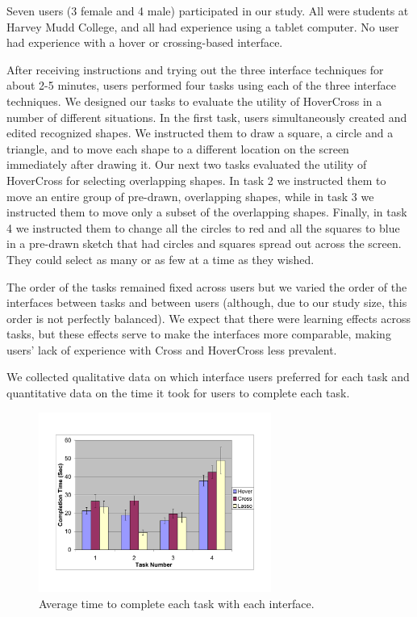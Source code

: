 \documentclass{article}
\begin{document}
Seven users (3 female and 4 male) participated in our study.   All
were students at Harvey Mudd College, and all had experience using
a tablet computer.  No user had experience with a hover or
crossing-based interface.   

After receiving instructions and trying out the three interface
techniques for about 2-5 minutes, users performed four tasks using
each of the three interface techniques.  We designed our tasks to
evaluate the utility of HoverCross in a number of different
situations.  In the first task, users simultaneously created and
edited recognized shapes.  We instructed them to draw a square, a
circle and a triangle, and to move each shape to a different location
on the screen immediately after drawing it.  Our next two tasks
evaluated the utility of HoverCross for selecting overlapping shapes.
In task 2 we instructed them to move an entire group of pre-drawn,
overlapping shapes, while in task 3 we instructed them to move only a
subset of the overlapping shapes.  Finally, in task 4 we instructed
them to change all the circles to red and all the squares to blue in a
pre-drawn sketch that had circles and squares spread out across the
screen. They could select as many or as few at a time as they wished.

The order of the tasks remained fixed across users but we varied the
order of the interfaces between tasks and between users (although, due
to our study size, this order is not perfectly balanced).  We expect
that there were learning effects across tasks, but these effects
serve to make the interfaces more comparable, making users' lack of
experience with Cross and HoverCross less prevalent.

We collected qualitative data on which interface users preferred
for each task and quantitative data on the time it took for users to
complete each task.

\begin{figure}
\begin{center}
\includegraphics[width=3.0in]{results}
\caption{Average time to complete each task with each interface.}
\label{fig:times}
\end{center}
\end{figure}
\end{document}
